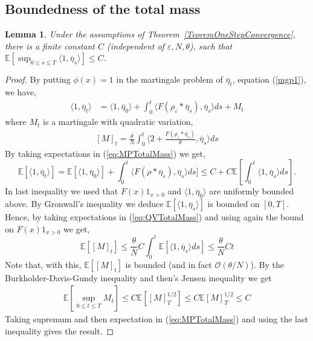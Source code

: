 \documentclass[a4paper,12pt]{article}
\newtheorem{lemma}[theorem]{Lemma}
\newcommand{\EE}{\mathbb{E}}
\newcommand{\1}{{\bf {1}}}
\def\epsilon{\varepsilon}
\begin{document}
\subsection{Boundedness of the total mass}
\begin{lemma} \label{Lemma:UniformlyBoundedMass}
Under the assumptions of Theorem~\ref{TeoremOneStepConvergence}, there is a finite constant $C$ (independent of $\epsilon, N, \theta$), such that $\EE\left[ \sup_{0 \leq s \leq T} \langle 1, \overline{\eta}_s \rangle \right] \leq C$.
\end{lemma}
\begin{proof}
By putting $\phi(x)=1$ in the martingale problem of $\overline{\eta}_t$, equation (\ref{mgp1}), we have,
\begin{align} \label{eq:MPTotalMass}
\langle 1, \overline{\eta}_t \rangle &= \langle 1, \overline{\eta}_0 \rangle + \int_0^t \langle F(\rho_\epsilon * \overline{\eta}_s), \overline{\eta}_s \rangle ds + M_t
\end{align}
where $M_t$ is a martingale with quadratic variation,
\begin{align} \label{eq:QVTotalMass}
[M]_t = \frac{\theta}{N}\int_0^t \langle 2 + \frac{F(\rho_\epsilon* \overline{\eta}_s)}{\theta}, \overline{\eta}_s \rangle d s 
\end{align}
By taking expectations in (\ref{eq:MPTotalMass}) we get,
\[ \EE[\langle 1, \overline{\eta}_t \rangle] =  \EE[\langle 1, \overline{\eta}_0 \rangle]  + \int_0^t \langle F(\rho * \overline{\eta}_s), \overline{\eta}_s \rangle ds ]   \leq C +   C \mathbb{E}\left[ \int_0^t \langle 1, \overline{\eta}_s \rangle ds \right].\] 
In last inequality we used that $F(x)1_{x >0}$ and $\langle 1, \overline{\eta}_0 \rangle$ are uniformly bounded above. By Gronwall's inequality we deduce $\EE[\langle 1, \overline{\eta}_s \rangle]$ is bounded on $[0,T]$. Hence, by taking expectations in (\ref{eq:QVTotalMass}) and using again the bound on $F(x)1_{x>0}$ we get,
\[ \EE\left[ [M]_t \right] \leq \frac{\theta}{N} C \int_0^t \mathbb{E}\left[ \langle 1, \overline{\eta}_s \rangle ds \right] \leq \frac{\theta}{N}C t \]
Note that, with this, $\EE[ [M]_t]$ is bounded (and in fact $\mathcal{O}(\theta/N)$). By the Burkholder-Davis-Gundy inequality and then's Jensen inequality we get
\begin{align*} \EE\left[ \sup_{0 \leq t \leq T} M_t \right] \leq C \EE\left[ [M]_T^{1/2} \right] \leq C \EE[M]_T^{1/2} \leq C   \end{align*}
Taking supremum and then expectation in (\ref{eq:MPTotalMass}) and using the last inequality gives the result.
\end{proof}
\end{document}
